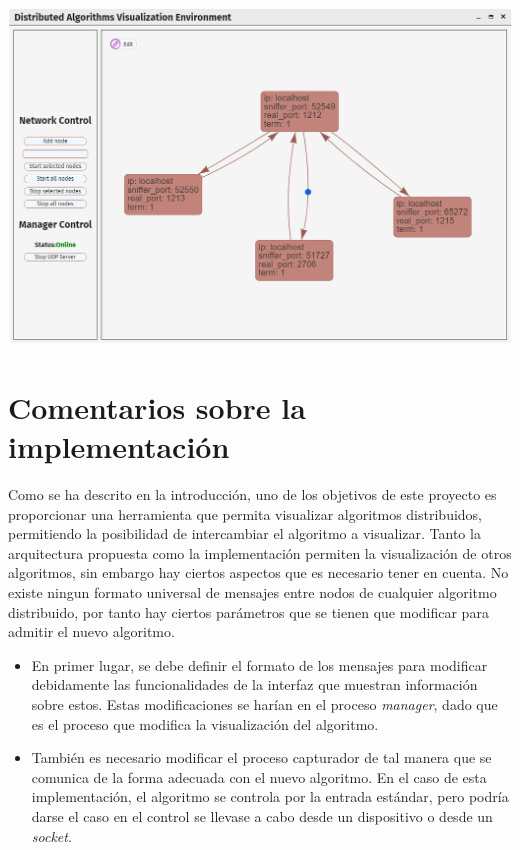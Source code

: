 {
\centering
\includegraphics[width=0.9\linewidth]{imagenes/ui8}
\label{fig:ui8}
}

\newpage

\section{Comentarios sobre la implementación}

Como se ha descrito en la introducción, uno de los objetivos de este proyecto es proporcionar una herramienta que permita visualizar algoritmos distribuidos, permitiendo la posibilidad de intercambiar el algoritmo a visualizar. Tanto la arquitectura propuesta como la implementación permiten la visualización de otros algoritmos, sin embargo hay ciertos aspectos que es necesario tener en cuenta. No existe ningun formato universal de mensajes entre nodos de cualquier algoritmo distribuido, por tanto hay ciertos parámetros que se tienen que modificar para admitir el nuevo algoritmo.

\begin{itemize}
\item En primer lugar, se debe definir el formato de los mensajes para modificar debidamente las funcionalidades de la interfaz que muestran información sobre estos. Estas modificaciones se harían en el proceso \textit{manager}, dado que es el proceso que modifica la visualización del algoritmo.

\item También es necesario modificar el proceso capturador de tal manera que se comunica de la forma adecuada con el nuevo algoritmo. En el caso de esta implementación, el algoritmo se controla por la entrada estándar, pero podría darse el caso en el control se llevase a cabo desde un dispositivo o desde un \textit{socket}.
\end{itemize}

